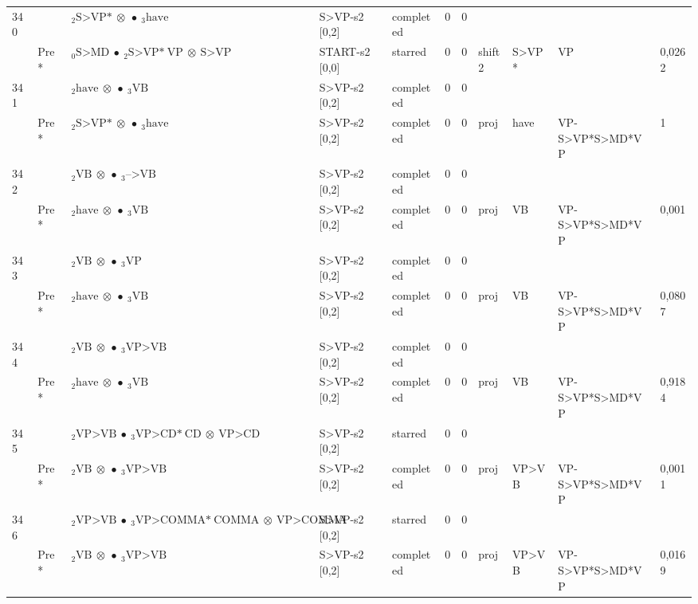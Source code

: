 \documentclass[10pt]{article}
\begin{document}
\begin{longtable}[htbp]{lllllllllll}
340 & & $ {}_2 \textrm{S>VP*} \  \otimes \  \bullet \ {}_{3} \textrm{have} $ & S>VP-s2 [0,2] & completed & 0 & 0 & & & & \\ 
 & Pre *& $ {}_0 \textrm{S>MD} \  \bullet \ {}_{2} \textrm{S>VP*} \ \textrm{VP} \  \otimes \ \textrm{S>VP} $ & START-s2 [0,0] & starred & 0 & 0 & shift2 & S>VP* & VP & 0,0262 \\ 
341 & & $ {}_2 \textrm{have} \  \otimes \  \bullet \ {}_{3} \textrm{VB} $ & S>VP-s2 [0,2] & completed & 0 & 0 & & & & \\ 
 & Pre *& $ {}_2 \textrm{S>VP*} \  \otimes \  \bullet \ {}_{3} \textrm{have} $ & S>VP-s2 [0,2] & completed & 0 & 0 & proj & have & VP-S>VP*S>MD*VP & 1 \\ 
342 & & $ {}_2 \textrm{VB} \  \otimes \  \bullet \ {}_{3} \textrm{-->VB} $ & S>VP-s2 [0,2] & completed & 0 & 0 & & & & \\ 
 & Pre *& $ {}_2 \textrm{have} \  \otimes \  \bullet \ {}_{3} \textrm{VB} $ & S>VP-s2 [0,2] & completed & 0 & 0 & proj & VB & VP-S>VP*S>MD*VP & 0,001 \\ 
343 & & $ {}_2 \textrm{VB} \  \otimes \  \bullet \ {}_{3} \textrm{VP} $ & S>VP-s2 [0,2] & completed & 0 & 0 & & & & \\ 
 & Pre *& $ {}_2 \textrm{have} \  \otimes \  \bullet \ {}_{3} \textrm{VB} $ & S>VP-s2 [0,2] & completed & 0 & 0 & proj & VB & VP-S>VP*S>MD*VP & 0,0807 \\ 
344 & & $ {}_2 \textrm{VB} \  \otimes \  \bullet \ {}_{3} \textrm{VP>VB} $ & S>VP-s2 [0,2] & completed & 0 & 0 & & & & \\ 
 & Pre *& $ {}_2 \textrm{have} \  \otimes \  \bullet \ {}_{3} \textrm{VB} $ & S>VP-s2 [0,2] & completed & 0 & 0 & proj & VB & VP-S>VP*S>MD*VP & 0,9184 \\ 
345 & & $ {}_2 \textrm{VP>VB} \  \bullet \ {}_{3} \textrm{VP>CD*} \ \textrm{CD} \  \otimes \ \textrm{VP>CD} $ & S>VP-s2 [0,2] & starred & 0 & 0 & & & & \\ 
 & Pre *& $ {}_2 \textrm{VB} \  \otimes \  \bullet \ {}_{3} \textrm{VP>VB} $ & S>VP-s2 [0,2] & completed & 0 & 0 & proj & VP>VB & VP-S>VP*S>MD*VP & 0,0011 \\ 
346 & & $ {}_2 \textrm{VP>VB} \  \bullet \ {}_{3} \textrm{VP>COMMA*} \ \textrm{COMMA} \  \otimes \ \textrm{VP>COMMA} $ & S>VP-s2 [0,2] & starred & 0 & 0 & & & & \\ 
 & Pre *& $ {}_2 \textrm{VB} \  \otimes \  \bullet \ {}_{3} \textrm{VP>VB} $ & S>VP-s2 [0,2] & completed & 0 & 0 & proj & VP>VB & VP-S>VP*S>MD*VP & 0,0169 \\ 

\end{longtable}
\end{document}

